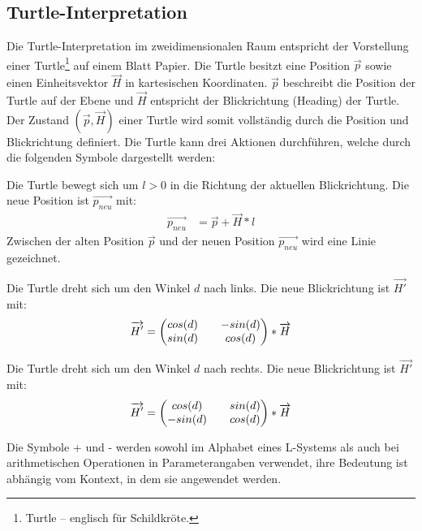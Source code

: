 \subsection{Turtle-Interpretation}

Die Turtle-Interpretation im zweidimensionalen Raum entspricht der Vorstellung einer Turtle\footnote{\glqq Turtle\grqq{} -- englisch für \glqq Schildkröte\grqq.} auf einem Blatt Papier. Die Turtle besitzt eine Position $\overrightarrow{p}$ sowie einen Einheitsvektor $\overrightarrow{H}$ in kartesischen Koordinaten. $\overrightarrow{p}$ beschreibt die Position der Turtle auf der Ebene und $\overrightarrow{H}$ entspricht der Blickrichtung (Heading) der Turtle. Der Zustand $(\overrightarrow{p},\overrightarrow{H})$ einer Turtle wird somit vollständig durch die Position und Blickrichtung definiert. \cite[S.2]{Turtle:04} Die Turtle kann drei Aktionen durchführen, welche durch die folgenden Symbole dargestellt werden:

\begin{description}[labelindent]
	\item[\boldmath$F(l)$] Die Turtle bewegt sich um $l>0$ in die Richtung der aktuellen Blickrichtung. Die neue Position ist  $\overrightarrow{p_{neu}}$ mit:
	\begin{equation}
	\begin{array}{ll}
	\overrightarrow{p_{neu}} & = \overrightarrow{p} + \overrightarrow{H} * l
	\end{array}
	\end{equation} 
	Zwischen der alten Position $\overrightarrow{p}$ und der neuen Position $\overrightarrow{p_{neu}}$ wird eine Linie gezeichnet.\\
	
	\item[\boldmath$+(d)$]  Die Turtle dreht sich um den Winkel $d$ nach links. Die neue Blickrichtung ist $\overrightarrow{H'}$ mit:
	\begin{equation}
	\overrightarrow{H'} = 
	\setlength\arraycolsep{10pt}
	\begin{pmatrix}
	cos(d) & -sin(d)\\
	sin(d) & cos(d)
	\end{pmatrix}
	* \overrightarrow{H}
	\end{equation} 
	
	\item[\boldmath$-(d)$]  Die Turtle dreht sich um den Winkel $d$ nach rechts. Die neue Blickrichtung ist $\overrightarrow{H'}$ mit:
	\begin{equation}
	\overrightarrow{H'} = 
	\setlength\arraycolsep{10pt}
	\begin{pmatrix}
	cos(d) & sin(d)\\
	-sin(d) & cos(d)
	\end{pmatrix}
	* \overrightarrow{H}
	\end{equation} 
	
\end{description}
\cite[S.4,46]{Turtle:04} \cite[S.7]{ABOP:04}
Die Symbole \glqq+\grqq{} und \glqq-\grqq{} werden sowohl im Alphabet eines L-Systems als auch bei arithmetischen Operationen in Parameterangaben verwendet, ihre Bedeutung ist abhängig vom Kontext, in dem sie angewendet werden. \cite[S.46]{ABOP:04}

